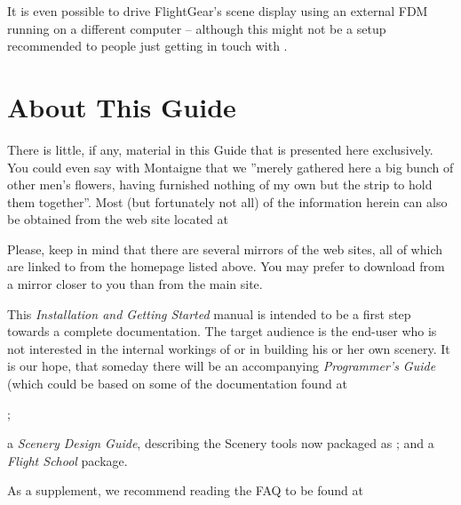 It is even possible to drive FlightGear's scene display using an external FDM
running on a different computer -- although this might not be a setup recommended to people just
getting in touch with \FlightGear.


\section{About This Guide}

There is little, if any, material in this Guide that is presented here exclusively. You
could even say with Montaigne that we ''merely gathered here a big bunch of other men's
flowers, having furnished nothing of my own but the strip to hold them together''. Most
(but fortunately not all) of the information herein can also be obtained from the
\FlightGear{} web site located at
\medskip

\medskip

Please, keep in mind that there are several mirrors of the \FlightGear{} web sites, all
of which are linked to from the \FlightGear{} homepage listed above.
You may prefer to download \FlightGear{} from a mirror closer to you than from the
main site.

This \textit{\FlightGear{} Installation and Getting Started} manual is intended to be a
first step towards a complete \FlightGear{} documentation. The target
audience is the end-user who is not interested in the internal workings of 
or in building his or her own scenery. It is our hope, that someday there
will be an accompanying \textit{\FlightGear{} Programmer's Guide} (which could be based on some of the documentation found at
 \medskip

;
 \medskip

 \noindent
a \textit{\FlightGear{} Scenery Design Guide},
describing the Scenery tools now packaged as \TerraGear{}; and a \textit{\FlightGear{}
Flight School} package.
 \medskip

As a supplement, we recommend reading the \FlightGear{} FAQ to be found at

